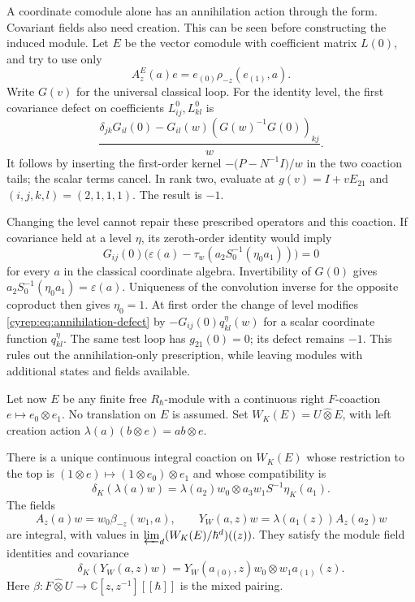 A coordinate comodule alone has an annihilation action through
the form. Covariant fields also need creation.
This can be seen before constructing the induced module.
Let \(E\) be the vector comodule with coefficient matrix \(L(0)\),
and try to use only
\[
 A^E_z(a)e=e_{(0)}\rho_{-z}(e_{(1)},a).
\]
Write \(G(v)\) for the universal classical loop.
For the identity level, the first covariance defect on coefficients
\(L^0_{ij},L^0_{kl}\) is
\begin{equation}\label{cyrep:eq:annihilation-defect}
 \frac{\delta_{jk}G_{il}(0)
       -G_{il}(w)(G(w)^{-1}G(0))_{kj}}{w}.
\end{equation}
It follows by inserting the first-order kernel
\(-\bigl(P-N^{-1}I\bigr)/w\) in the two coaction tails;
the scalar terms cancel.
In rank two, evaluate at \(g(v)=I+vE_{21}\) and
\((i,j,k,l)=(2,1,1,1)\). The result is \(-1\).

Changing the level cannot repair these prescribed operators and
this coaction. If covariance held at a level \(\eta\), its
zeroth-order identity would imply
\[
 G_{ij}(0)\bigl(\varepsilon(a)
       -\tau_w(a_2S_0^{-1}(\eta_0a_1))\bigr)=0
\]
for every \(a\) in the classical coordinate algebra.
Invertibility of \(G(0)\) gives
\(a_2S_0^{-1}(\eta_0a_1)=\varepsilon(a)\).
Uniqueness of the convolution inverse for the opposite coproduct
then gives \(\eta_0=1\).
At first order the change of level modifies
\eqref{cyrep:eq:annihilation-defect} by
\(-G_{ij}(0)q^\eta_{kl}(w)\) for a scalar coordinate function
\(q^\eta_{kl}\). The same test loop has \(g_{21}(0)=0\);
its defect remains \(-1\).
This rules out the annihilation-only prescription, while leaving
modules with additional states and fields available.

Let now \(E\) be any finite free \(R_\hbar\)-module with a
continuous right \(F\)-coaction
\(e\mapsto e_0\otimes e_1\).
No translation on \(E\) is assumed.
Set \(W_K(E)=U\widehat\otimes E\), with left creation action
\(\lambda(a)(b\otimes e)=ab\otimes e\).

\begin{theorem}\label{cyrep:thm:induction}
There is a unique continuous integral coaction on \(W_K(E)\)
whose restriction to the top is
\((1\otimes e)\mapsto(1\otimes e_0)\otimes e_1\)
and whose compatibility is
\begin{equation}\label{cyrep:eq:module-coaction}
 \delta_K(\lambda(a)w)
       =\lambda(a_2)w_0\otimes a_3w_1S^{-1}\eta_K(a_1).
\end{equation}
The fields
\begin{equation}\label{cyrep:eq:module-fields}
 A_z(a)w=w_0\beta_{-z}(w_1,a),\qquad
 Y_W(a,z)w=\lambda(a_1(z))A_z(a_2)w
\end{equation}
are integral, with values in
\(\varprojlim_d(W_K(E)/\hbar^d)((z))\).
They satisfy the module field identities and covariance
\[
 \delta_K(Y_W(a,z)w)
       =Y_W(a_{(0)},z)w_0\otimes w_1a_{(1)}(z).
\]
Here \(\beta:F\widehat\otimes U\to
\mathbb C[z,z^{-1}][[\hbar]]\) is the mixed pairing.
\end{theorem}

